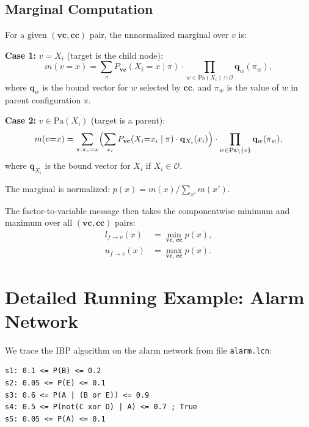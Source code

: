 \documentclass[11pt]{article}
\begin{document}
\subsection{Marginal Computation}

For a given $(\mathbf{vc}, \mathbf{cc})$ pair, the unnormalized marginal over $v$ is:

\medskip
\noindent\textbf{Case 1:} $v = X_i$ (target is the child node):
\begin{equation}\label{eq:case1}
  m(v{=}x) = \sum_{\pi} P_{\mathbf{vc}}(X_i{=}x \mid \pi)
  \cdot \prod_{w \in \mathrm{Pa}(X_i) \cap \mathcal{O}} \mathbf{q}_w(\pi_w),
\end{equation}
where $\mathbf{q}_w$ is the bound vector for $w$ selected by $\mathbf{cc}$, and
$\pi_w$ is the value of $w$ in parent configuration $\pi$.

\medskip
\noindent\textbf{Case 2:} $v \in \mathrm{Pa}(X_i)$ (target is a parent):
\begin{equation}\label{eq:case2}
  m(v{=}x) = \sum_{\pi : \pi_v = x}
  \Bigl(\sum_{x_i} P_{\mathbf{vc}}(X_i{=}x_i \mid \pi) \cdot \mathbf{q}_{X_i}(x_i)\Bigr)
  \cdot \prod_{w \in \mathrm{Pa} \setminus \{v\}} \mathbf{q}_w(\pi_w),
\end{equation}
where $\mathbf{q}_{X_i}$ is the bound vector for $X_i$ if $X_i \in \mathcal{O}$.

\medskip
The marginal is normalized: $p(x) = m(x) / \sum_{x'} m(x')$.

The factor-to-variable message then takes the componentwise minimum and maximum
over all $(\mathbf{vc}, \mathbf{cc})$ pairs:
\begin{align*}
  l_{f \to v}(x) &= \min_{\mathbf{vc},\,\mathbf{cc}} p(x), \\
  u_{f \to v}(x) &= \max_{\mathbf{vc},\,\mathbf{cc}} p(x).
\end{align*}

\section{Detailed Running Example: Alarm Network}

We trace the IBP algorithm on the alarm network from file \texttt{alarm.lcn}:
\begin{verbatim}
s1: 0.1 <= P(B) <= 0.2
s2: 0.05 <= P(E) <= 0.1
s3: 0.6 <= P(A | (B or E)) <= 0.9
s4: 0.5 <= P(not(C xor D) | A) <= 0.7 ; True
s5: 0.05 <= P(A) <= 0.1
\end{verbatim}
\end{document}
